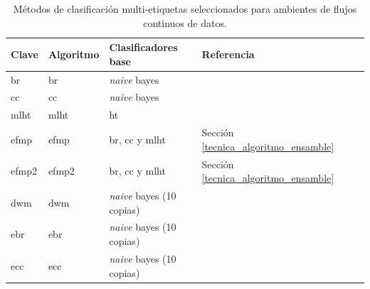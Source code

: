 \begin{table}[htbp]
	\centering
	\label{tab:algoritmos}
	\begin{adjustbox}{max width=\textwidth}
		\begin{tabular}{lllll}
			\toprule
			Clave                                          & Algoritmo                             & Clasificadores base  & Referencia & \\
			\midrule
			\acrshort{br}                                  & \acrlong{br}                          & \textit{naive} bayes
			                                               & \textcite{tsoumakas_multi-label_2007} &                                     \\
			\acrshort{cc}                                  & \acrlong{cc}                          & \textit{naive} bayes &
			\textcite{read_classifier_2011}                &                                                                             \\
			\acrshort{mlht}                                & \acrlong{mlht}                        & \acrfull{ht}         &
			\textcite{read_scalable_2012}                  &                                                                             \\
			\acrshort{efmp}                                & \acrlong{efmp}                        &
			\acrshort{br}, \acrshort{cc} y \acrshort{mlht} &
			Sección \ref{tecnica_algoritmo_ensamble}       &                                                                             \\
			\acrshort{efmp2}                               & \acrlong{efmp2}                       &
			\acrshort{br}, \acrshort{cc} y \acrshort{mlht} &
			Sección \ref{tecnica_algoritmo_ensamble}       &                                                                             \\
			\acrshort{dwm}                                 & \acrlong{dwm}                         &
			\textit{naive} bayes (10 copias)               &
			\textcite{kolter_dynamic_2007}                 &                                                                             \\
			\acrshort{ebr}                                 & \acrlong{ebr}
			                                               & \textit{naive} bayes (10
			copias)                                        &
			\textcite{read_classifier_2011}                &                                                                             \\
			\acrshort{ecc}                                 & \acrlong{ecc}
			                                               & \textit{naive} bayes (10
			copias)                                        &
			\textcite{read_classifier_2011}                &                                                                             \\
			\bottomrule
		\end{tabular}
	\end{adjustbox}
	\caption{Métodos de clasificación multi-etiquetas seleccionados para ambientes
		de flujos continuos de datos.}
\end{table}

